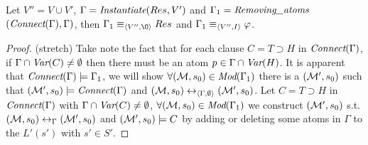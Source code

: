 \documentclass{article}
\begin{document}
\begin{proposition}\label{pro:elm}
Let $V''=V \cup V'$, $\Gamma=\emph{Instantiate}(Res, V')$ and $\Gamma_1=\emph{Removing\_atoms}$ $(\emph{Connect}(\Gamma), \Gamma)$, then  $\Gamma_1\equiv_{\tuple{V'', {\O}}} Res$ and $\Gamma_1 \equiv_{{\langle{V'', I}\rangle}} \varphi$.
\end{proposition}
\begin{proof}(stretch)
Take note the fact that for each clause $C = T \supset H$ in $\emph{Connect}(\Gamma)$, if $\Gamma \cap \textit{Var}(C) \neq \emptyset$ then there must be an atom $p\in \Gamma \cap \textit{Var}(H)$. It is apparent that $\emph{Connect}(\Gamma) \models \Gamma_1$, we will show $\forall ({\cal M}, s_0) \in \textit{Mod}(\Gamma_1)$ there is a $({\cal M}', s_0)$ such that $({\cal M}', s_0) \models \emph{Connect}(\Gamma)$ and $({\cal M}, s_0) \leftrightarrow_{{\langle{\Gamma, \emptyset}\rangle}} ({\cal M}', s_0)$.
Let $C = T \supset H$ in $\emph{Connect}(\Gamma)$ with $\Gamma \cap \textit{Var}(C) \neq \emptyset$,
$\forall ({\cal M}, s_0) \in \textit{Mod}(\Gamma_1)$ we construct $({\cal M}', s_0)$ s.t. $({\cal M},s_0) \leftrightarrow_{\Gamma} ({\cal M}', s_0)$ and $({\cal M}', s_0) \models C$ by adding or deleting some atoms in $\Gamma$ to the $L'(s')$ with $s'\in S'$.


\end{proof}
\end{document}

